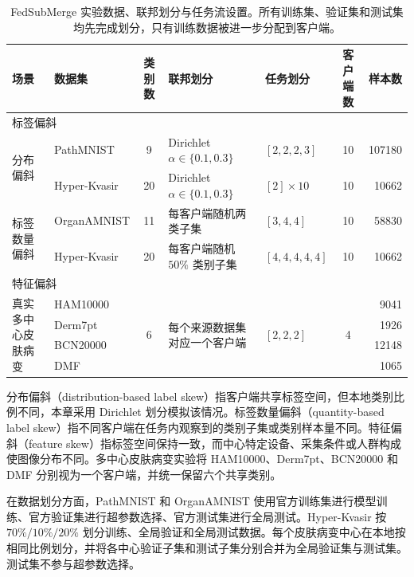 \begin{table}[htbp]
\centering
\caption{FedSubMerge 实验数据、联邦划分与任务流设置。所有训练集、验证集和测试集均先完成划分，只有训练数据被进一步分配到客户端。}
\label{tab:fedsubmerge-setup}
\thesistablefont
\setlength{\tabcolsep}{3pt}
\renewcommand{\arraystretch}{1.15}
\begin{tabular}{@{}p{1.4cm}p{2.55cm}cp{3.1cm}p{1.85cm}cr@{}}
\toprule
场景 & 数据集 & 类别数 & 联邦划分 & 任务划分 & 客户端数 & 样本数 \\
\midrule
\multicolumn{7}{l}{标签偏斜} \\
\multirow{2}{1.4cm}{分布偏斜} & PathMNIST & 9 & Dirichlet $\alpha\in\{0.1,0.3\}$ & $[2,2,2,3]$ & 10 & 107180 \\
& Hyper-Kvasir & 20 & Dirichlet $\alpha\in\{0.1,0.3\}$ & $[2]\times10$ & 10 & 10662 \\
\multirow{2}{1.4cm}{标签数量偏斜} & OrganAMNIST & 11 & 每客户端随机两类子集 & $[3,4,4]$ & 10 & 58830 \\
& Hyper-Kvasir & 20 & 每客户端随机 $50\%$ 类别子集 & $[4,4,4,4,4]$ & 10 & 10662 \\
\midrule
\multicolumn{7}{l}{特征偏斜} \\
\multirow{4}{1.4cm}{真实多中心皮肤病变} & HAM10000 & \multirow{4}{*}{6} & \multirow{4}{3.1cm}{每个来源数据集对应一个客户端} & \multirow{4}{*}{$[2,2,2]$} & \multirow{4}{*}{4} & 9041 \\
& Derm7pt & & & & & 1926 \\
& BCN20000 & & & & & 12148 \\
& DMF & & & & & 1065 \\
\bottomrule
\end{tabular}%

\end{table}

分布偏斜（distribution-based label skew）指客户端共享标签空间，但本地类别比例不同，本章采用 Dirichlet 划分模拟该情况\cite{hsu2019dirichlet}。标签数量偏斜（quantity-based label skew）指不同客户端在任务内观察到的类别子集或类别样本量不同。特征偏斜（feature skew）指标签空间保持一致，而中心特定设备、采集条件或人群构成使图像分布不同。多中心皮肤病变实验将 HAM10000、Derm7pt、BCN20000 和 DMF 分别视为一个客户端，并统一保留六个共享类别。

在数据划分方面，PathMNIST 和 OrganAMNIST 使用官方训练集进行模型训练、官方验证集进行超参数选择、官方测试集进行全局测试。Hyper-Kvasir 按 $70\%/10\%/20\%$ 划分训练、全局验证和全局测试数据。每个皮肤病变中心在本地按相同比例划分，并将各中心验证子集和测试子集分别合并为全局验证集与测试集。测试集不参与超参数选择。

